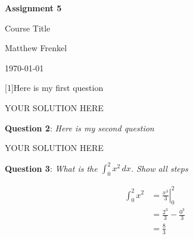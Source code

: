 \documentclass{article} %
\newcommand{\question}[2][]{\begin{flushleft}
        \textbf{Question #1}: \textit{#2}

\end{flushleft}}
\newcommand{\maketitletwo}[2][]{\begin{center}
        \Large{\textbf{Assignment #1}
            
            Course Title} %
        \vspace{5pt}
        
        \normalsize{Matthew Frenkel  %
        
        \today}        %
        \vspace{15pt}
        
\end{center}}
\begin{document}
    \maketitletwo[5]  %
    
    \question[1]{Here is my first question} 
    
    YOUR SOLUTION HERE
    
    \question[2]{Here is my second question}
    
    YOUR SOLUTION HERE
    
    \question[3]{What is the \Large{$\int_0^2 x^2 \, dx $}\normalsize{. Show all steps}}
    
    \begin{align*}
    \int_0^2 x^2 &= \left. \frac{x^3}{3} \right|_0^2 \\
                 &= \frac{2^3}{3}-\frac{0^3}{3}\\
                 &= \frac{8}{3}
    \end{align*}
\end{document}
